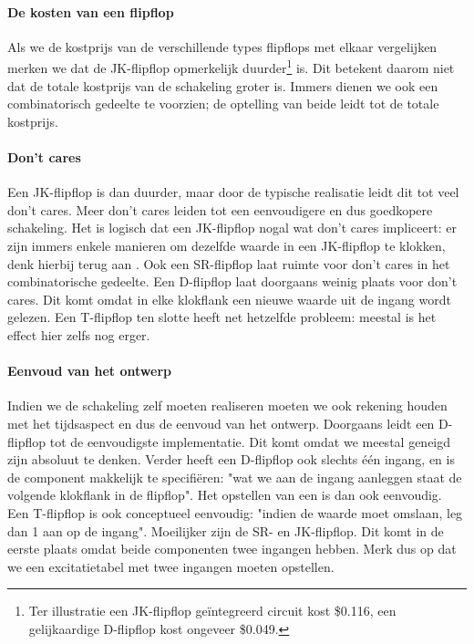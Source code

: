 \paragraph{De kosten van een flipflop}
Als we de kostprijs van de verschillende types flipflops met elkaar vergelijken merken we dat de JK-flipflop opmerkelijk duurder\footnote{Ter illustratie een JK-flipflop ge\"integreerd circuit kost \$0.116, een gelijkaardige D-flipflop kost ongeveer \$0.049.} is. Dit betekent daarom niet dat de totale kostprijs van de schakeling groter is. Immers dienen we ook een combinatorisch gedeelte te voorzien; de optelling van beide leidt tot de totale kostprijs.

\paragraph{Don't cares}
Een JK-flipflop is dan duurder, maar door de typische realisatie leidt dit tot veel don't cares. Meer don't cares leiden tot een eenvoudigere en dus goedkopere schakeling. Het is logisch dat een JK-flipflop nogal wat don't cares impliceert: er zijn immers enkele manieren om dezelfde waarde in een JK-flipflop te klokken, denk hierbij terug aan . Ook een SR-flipflop laat ruimte voor don't cares in het combinatorische gedeelte. Een D-flipflop laat doorgaans weinig plaats voor don't cares. Dit komt omdat in elke klokflank een nieuwe waarde uit de ingang wordt gelezen. Een T-flipflop ten slotte heeft net hetzelfde probleem: meestal is het effect hier zelfs nog erger.

\paragraph{Eenvoud van het ontwerp}
Indien we de schakeling zelf moeten realiseren moeten we ook rekening houden met het tijdsaspect en dus de eenvoud van het ontwerp. Doorgaans leidt een D-flipflop tot de eenvoudigste implementatie. Dit komt omdat we meestal geneigd zijn absoluut te denken. Verder heeft een D-flipflop ook slechts \'e\'en ingang, en is de component makkelijk te specifi\"eren: "wat we aan de ingang aanleggen staat de volgende klokflank in de flipflop". Het opstellen van een  is dan ook eenvoudig. Een T-flipflop is ook conceptueel eenvoudig: "indien de waarde moet omslaan, leg dan 1 aan op de ingang". Moeilijker zijn de SR- en JK-flipflop. Dit komt in de eerste plaats omdat beide componenten twee ingangen hebben. Merk dus op dat we een excitatietabel met twee ingangen moeten opstellen.

